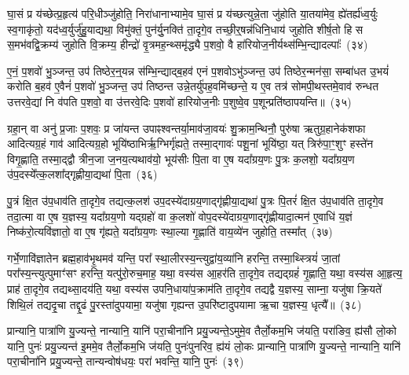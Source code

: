 घा॒सं प्र य॑च्छेत्प्र॒हृत्य॑ परि॒धीञ्जु॑होति॒ निरा॑धानाभ्यामे॒व घा॒सं प्र य॑च्छत्युन्ने॒ता जु॑होति या॒तया॑मेव॒ ह्ये॑तर्\mbox{}ह्य॑ध्व॒र्युः स्व॒गाकृ॑तो॒ यद॑ध्व॒र्युर्जु॑हु॒याद्यथा॒ विमु॑क्तं॒ पुन॑र्यु॒नक्ति॑ ता॒दृगे॒व तच्छी॒र्॒\mbox{}षन्न॑धिनि॒धाय॑ जुहोति शीर्\mbox{}ष॒तो हि स स॒मभ॑वद्वि॒क्रम्य॑ जुहोति वि॒क्रम्य॒ हीन्द्रो॑ वृ॒त्रमह॒न्थ्समृ॑द्ध्यै प॒शवो॒ वै हा॑रियोज॒नीर्यथ्स॑म्भि॒न्द्यादल्पाः᳚~(३४)

ए॒नं॒ प॒शवो॑ भु॒ञ्जन्त॒ उप॑ तिष्ठेर॒न्॒यन्न स॑म्भि॒न्द्याद्ब॒हव॑ एनं प॒शवो\-ऽभु॑ञ्जन्त॒ उप॑ तिष्ठेर॒न्मन॑सा॒ सम्बा॑धत उ॒भयं॑ करोति ब॒हव॑ ए॒वैनं॑ प॒शवो॑ भु॒ञ्जन्त॒ उप॑ तिष्ठन्त उन्ने॒तर्यु॑पह॒वमि॑च्छन्ते॒ य ए॒व तत्र॑ सोमपी॒थस्तमे॒वाव॑ रुन्धत उत्तरवे॒द्यां नि व॑पति प॒शवो॒ वा उ॑त्तरवे॒दिः प॒शवो॑ हारियोज॒नीः प॒शुष्वे॒व प॒शून्प्रति॑\-ष्ठापयन्ति॥~(३५)

{\anuvakamend[{अ॒श्री॒णा॒द॒न्तरा॑धानाभ्या॒मल्पाः᳚ स्थापयन्ति}]}%

ग्रहा॒न् वा अनु॑ प्र॒जाः प॒शवः॒ प्र जा॑यन्त उपाꣴश्वन्तर्या॒माव॑जा॒वयः॑ शु॒क्राम॒न्थिनौ॒ पुरु॑षा ऋतुग्र॒हानेक॑शफा आदित्यग्र॒हं गाव॑ आदित्यग्र॒हो भूयि॑ष्ठाभिर्\mbox{}ऋ॒ग्भिर्गृ॑ह्यते॒ तस्मा॒द्गावः॑ पशू॒नां भूयि॑ष्ठा॒ यत् त्रिरु॑पा॒ꣳ॒शुꣳ हस्ते॑न विगृ॒ह्णाति॒ तस्मा॒द्द्वौ त्रीन॒जा ज॒नय॒त्यथाव॑यो॒ भूय॑सीः पि॒ता वा ए॒ष यदा᳚ग्रय॒णः पु॒त्रः क॒लशो॒ यदा᳚ग्रय॒ण उ॑प॒दस्ये᳚त्क॒लशा᳚द्गृह्णीया॒द्यथा॑ पि॒ता~(३६)

पु॒त्रं क्षि॒त उ॑प॒धाव॑ति ता॒दृगे॒व तद्यत्क॒लश॑ उप॒दस्ये॑दाग्रय॒णाद्गृ॑ह्णीया॒द्यथा॑ पु॒त्रः पि॒तरं॑ क्षि॒त उ॑प॒धाव॑ति ता॒दृगे॒व तदा॒त्मा वा ए॒ष य॒ज्ञस्य॒ यदा᳚ग्रय॒णो यद्ग्रहो॑ वा क॒लशो॑ वोप॒दस्ये॑दाग्रय॒णाद्गृ॑ह्णीयादा॒त्मन॑ ए॒वाधि॑ य॒ज्ञं निष्क॑रो॒त्यवि॑ज्ञातो॒ वा ए॒ष गृ॑ह्यते॒ यदा᳚ग्रय॒णः स्था॒ल्या गृ॒ह्णाति॑ वाय॒व्ये॑न जुहोति॒ तस्मा᳚त्~(३७)

गर्भे॒णावि॑ज्ञातेन ब्रह्म॒हाव॑भृ॒थमव॑ यन्ति॒ परा᳚ स्था॒लीरस्य॒न्त्युद्वा॑य॒व्या॑नि हरन्ति॒ तस्मा॒थ्स्त्रियं॑ जा॒तां परा᳚स्य॒न्त्यु\-त्पुमाꣳ॑सꣳ हरन्ति॒ यत्पु॑रो॒रुच॒माह॒ यथा॒ वस्य॑स आ॒हर॑ति ता॒दृगे॒व तद्यद्ग्रहं॑ गृ॒ह्णाति॒ यथा॒ वस्य॑स आ॒हृत्य॒ प्राह॑ ता॒दृगे॒व तद्यथ्सा॒दय॑ति॒ यथा॒ वस्य॑स उपनि॒धाया॑प॒क्राम॑ति ता॒दृगे॒व तद्यद्वै य॒ज्ञस्य॒ साम्ना॒ यजु॑षा क्रि॒यते॑ शिथि॒लं तद्यदृ॒चा तद्दृ॒ढं पु॒रस्ता॑दुपयामा॒ यजु॑षा गृह्यन्त उ॒परि॑ष्टादुपयामा ऋ॒चा य॒ज्ञस्य॒ धृत्यै᳚॥~(३८)

{\anuvakamend[{यथा॑ पि॒ता तस्मा॑दप॒क्राम॑ति ता॒दृगे॒व तद्यद॒ष्टाद॑श च}]}%

प्रान्यानि॒ पात्रा॑णि यु॒ज्यन्ते॒ नान्यानि॒ यानि॑ परा॒चीना॑नि प्रयु॒ज्यन्ते॒\-ऽमुमे॒व तैर्लो॒कम॒भि ज॑यति॒ परा॑ङिव॒ ह्य॑सौ लो॒को यानि॒ पुनः॑ प्रयु॒ज्यन्त॑ इ॒ममे॒व तैर्लो॒कम॒भि ज॑यति॒ पुनः॑पुनरिव॒ ह्य॑यं लो॒कः प्रान्यानि॒ पात्रा॑णि यु॒ज्यन्ते॒ नान्यानि॒ यानि॑ परा॒चीना॑नि प्रयु॒ज्यन्ते॒ तान्यन्वोष॑धयः॒ परा॑ भवन्ति॒ यानि॒ पुनः॑~(३९)

